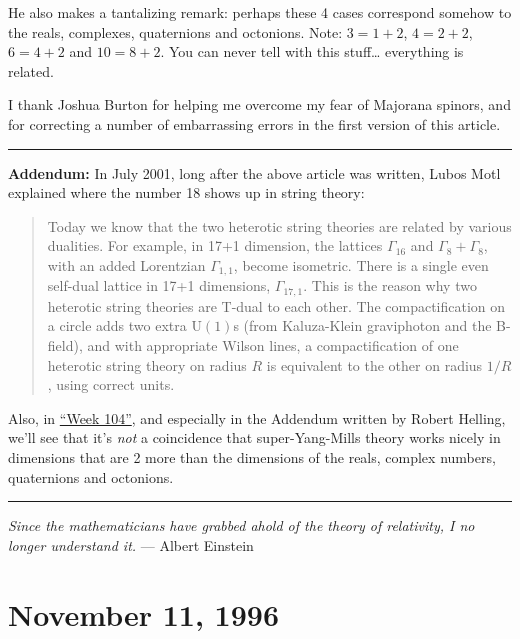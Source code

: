 \documentclass{article}
\begin{document}
He also makes a tantalizing remark: perhaps these 4 cases correspond
somehow to the reals, complexes, quaternions and octonions. Note:
\(3 = 1 + 2\), \(4 = 2 + 2\), \(6 = 4 + 2\) and \(10 = 8 + 2\). You can
never tell with this stuff\ldots{} everything is related.

I thank Joshua Burton for helping me overcome my fear of Majorana
spinors, and for correcting a number of embarrassing errors in the first
version of this article.

\begin{center}\rule{0.5\linewidth}{0.5pt}\end{center}

\textbf{Addendum:} In July 2001, long after the above article was
written, Lubos Motl explained where the number 18 shows up in string
theory:

\begin{quote}
Today we know that the two heterotic string theories are related by
various dualities. For example, in 17+1 dimension, the lattices
\(\Gamma_{16}\) and \(\Gamma_8+\Gamma_8\), with an added Lorentzian
\(\Gamma_{1,1}\), become isometric. There is a single even self-dual
lattice in 17+1 dimensions, \(\Gamma_{17,1}\). This is the reason why
two heterotic string theories are T-dual to each other. The
compactification on a circle adds two extra \(\mathrm{U}(1)\)s (from
Kaluza-Klein graviphoton and the B-field), and with appropriate Wilson
lines, a compactification of one heterotic string theory on radius \(R\)
is equivalent to the other on radius \(1/R\), using correct units.
\end{quote}

Also, in \protect\hyperlink{week104}{``Week 104''}, and especially in
the Addendum written by Robert Helling, we'll see that it's \emph{not} a
coincidence that super-Yang-Mills theory works nicely in dimensions that
are 2 more than the dimensions of the reals, complex numbers,
quaternions and octonions.

\begin{center}\rule{0.5\linewidth}{0.5pt}\end{center}

\emph{Since the mathematicians have grabbed ahold of the theory of
relativity, I no longer understand it.} --- Albert Einstein
\hypertarget{week94}{%
\section{November 11, 1996}\label{week94}}
\end{document}
